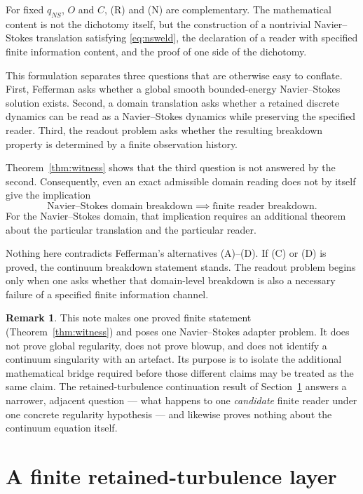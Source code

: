 \documentclass[11pt]{article}
\theoremstyle{plain}
\theoremstyle{definition}
\newtheorem{remark}[theorem]{Remark}
\begin{document}
\smallskip
For fixed $q_{NS}$, $O$ and $C$, (R) and (N) are complementary. The mathematical content is not the
dichotomy itself, but the construction of a nontrivial Navier--Stokes translation satisfying
\eqref{eq:nsweld}, the declaration of a reader with specified finite information content, and the
proof of one side of the dichotomy.

This formulation separates three questions that are otherwise easy to conflate. First, Fefferman
asks whether a global smooth bounded-energy Navier--Stokes solution exists. Second, a domain
translation asks whether a retained discrete dynamics can be read as a Navier--Stokes dynamics
while preserving the specified reader. Third, the readout problem asks whether the resulting
breakdown property is determined by a finite observation history.

Theorem~\ref{thm:witness} shows that the third question is not answered by the second.
Consequently, even an exact admissible domain reading does not by itself give the implication
\begin{equation}
  \text{Navier--Stokes domain breakdown} \implies \text{finite reader breakdown}. \label{eq:implication}
\end{equation}
For the Navier--Stokes domain, that implication requires an additional theorem about the
particular translation and the particular reader.

Nothing here contradicts Fefferman's alternatives (A)--(D). If (C) or (D) is proved, the continuum
breakdown statement stands. The readout problem begins only when one asks whether that
domain-level breakdown is also a necessary failure of a specified finite information channel.

\begin{remark}\label{rem:boundary}
This note makes one proved finite statement (Theorem~\ref{thm:witness}) and poses one
Navier--Stokes adapter problem. It does not prove global regularity, does not prove blowup, and
does not identify a continuum singularity with an artefact. Its purpose is to isolate the
additional mathematical bridge required before those different claims may be treated as the same
claim. The retained-turbulence continuation result of Section~\ref{sec:continuation} answers a
narrower, adjacent question --- what happens to one \emph{candidate} finite reader under one
concrete regularity hypothesis --- and likewise proves nothing about the continuum equation
itself.
\end{remark}

\section{A finite retained-turbulence layer}\label{sec:continuation}
\end{document}
